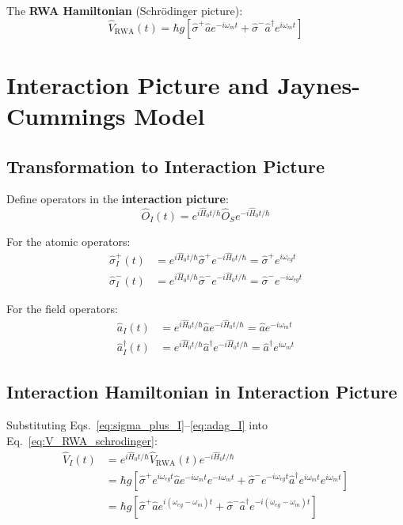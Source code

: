 \documentclass[12pt,a4paper]{article}
\begin{document}
The \textbf{RWA Hamiltonian} (Schrödinger picture):
\begin{equation}
\hat{V}_{\text{RWA}}(t) = \hbar g\left[\hat{\sigma}^+ \hat{a} e^{-i\omega_m t} + \hat{\sigma}^- \hat{a}^\dagger e^{i\omega_m t}\right] \label{eq:V_RWA_schrodinger}
\end{equation}

\section{Interaction Picture and Jaynes-Cummings Model}

\subsection{Transformation to Interaction Picture}

Define operators in the \textbf{interaction picture}:
\begin{equation}
\hat{O}_I(t) = e^{i\hat{H}_0 t/\hbar} \hat{O}_S e^{-i\hat{H}_0 t/\hbar}
\end{equation}

For the atomic operators:
\begin{align}
\hat{\sigma}^+_I(t) &= e^{i\hat{H}_0 t/\hbar} \hat{\sigma}^+ e^{-i\hat{H}_0 t/\hbar} = \hat{\sigma}^+ e^{i\omega_{eg}t} \label{eq:sigma_plus_I}\\
\hat{\sigma}^-_I(t) &= e^{i\hat{H}_0 t/\hbar} \hat{\sigma}^- e^{-i\hat{H}_0 t/\hbar} = \hat{\sigma}^- e^{-i\omega_{eg}t} \label{eq:sigma_minus_I}
\end{align}

For the field operators:
\begin{align}
\hat{a}_I(t) &= e^{i\hat{H}_0 t/\hbar} \hat{a} e^{-i\hat{H}_0 t/\hbar} = \hat{a} e^{-i\omega_m t} \label{eq:a_I}\\
\hat{a}^\dagger_I(t) &= e^{i\hat{H}_0 t/\hbar} \hat{a}^\dagger e^{-i\hat{H}_0 t/\hbar} = \hat{a}^\dagger e^{i\omega_m t} \label{eq:adag_I}
\end{align}

\subsection{Interaction Hamiltonian in Interaction Picture}

Substituting Eqs.~\eqref{eq:sigma_plus_I}--\eqref{eq:adag_I} into Eq.~\eqref{eq:V_RWA_schrodinger}:
\begin{align}
\hat{V}_I(t) &= e^{i\hat{H}_0 t/\hbar} \hat{V}_{\text{RWA}}(t) e^{-i\hat{H}_0 t/\hbar} \nonumber\\
&= \hbar g\left[\hat{\sigma}^+ e^{i\omega_{eg}t} \hat{a} e^{-i\omega_m t} e^{-i\omega_m t} + \hat{\sigma}^- e^{-i\omega_{eg}t} \hat{a}^\dagger e^{i\omega_m t} e^{i\omega_m t}\right] \nonumber\\
&= \hbar g\left[\hat{\sigma}^+ \hat{a} e^{i(\omega_{eg} - \omega_m)t} + \hat{\sigma}^- \hat{a}^\dagger e^{-i(\omega_{eg} - \omega_m)t}\right] \label{eq:V_I_general}
\end{align}
\end{document}
